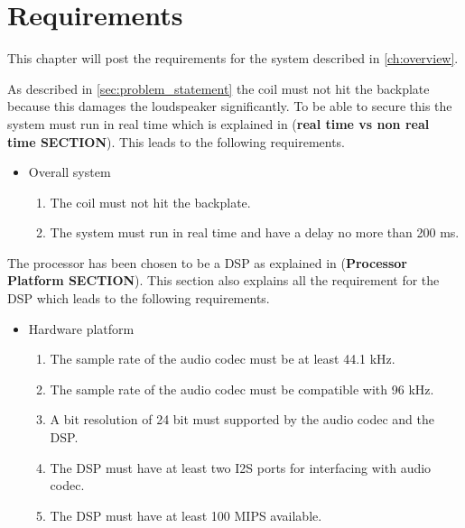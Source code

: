 \chapter{Requirements} \label{ch:requirements}
This chapter will post the requirements for the system described in \autoref{ch:overview}.  

As described in \autoref{sec:problem_statement} the coil must not hit the backplate because this damages the loudspeaker significantly. To be able to secure this the system must run in real time which is explained in (\textbf{real time vs non real time SECTION}). This leads to the following requirements.

\begin{itemize}
\item Overall system
\begin{enumerate}
\item [\textlabel{1}{coil}] The coil must not hit the backplate.\\
\item [\textlabel{2}{realtime}] The system must run in real time and have a delay no more than 200 ms.

\end{enumerate}
\end{itemize}

The processor has been chosen to be a DSP as explained in (\textbf{Processor Platform SECTION}). This section also explains all the requirement for the DSP which leads to the following requirements. 

\begin{itemize}
\item Hardware platform
\begin{enumerate}
\item [\textlabel{3}{samplerate44}] The sample rate of the audio codec must be at least 44.1 kHz.\\
\item [\textlabel{4}{samplerate96}] The sample rate of the audio codec must be compatible with 96 kHz.\\
\item [\textlabel{5}{resolution}]  A bit resolution of 24 bit must supported by the audio codec and the DSP.\\
\item [\textlabel{6}{I2S}] The DSP must have at least two I2S ports for interfacing with audio codec.\\
\item [\textlabel{7}{MIPS}] The DSP must have at least 100 MIPS available.
\end{enumerate}
\end{itemize}

